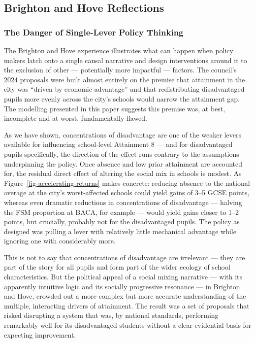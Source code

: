 \documentclass[
  11pt,
]{article}
\begin{document}
\subsection{Brighton and Hove
Reflections}\label{brighton-and-hove-reflections}

\subsubsection{The Danger of Single-Lever Policy
Thinking}\label{the-danger-of-single-lever-policy-thinking}

The Brighton and Hove experience illustrates what can happen when policy
makers latch onto a single causal narrative and design interventions
around it to the exclusion of other --- potentially more impactful ---
factors. The council's 2024 proposals were built almost entirely on the
premise that attainment in the city was ``driven by economic advantage''
and that redistributing disadvantaged pupils more evenly across the
city's schools would narrow the attainment gap. The modelling presented
in this paper suggests this premise was, at best, incomplete and at
worst, fundamentally flawed.

As we have shown, concentrations of disadvantage are one of the weaker
levers available for influencing school-level Attainment 8 --- and for
disadvantaged pupils specifically, the direction of the effect runs
contrary to the assumptions underpinning the policy. Once absence and
low prior attainment are accounted for, the residual direct effect of
altering the social mix in schools is modest. As
Figure~\ref{fig-accelerating-returns} makes concrete: reducing absence
to the national average at the city's worst-affected schools could yield
gains of 3--5 GCSE points, whereas even dramatic reductions in
concentrations of disadvantage --- halving the FSM proportion at BACA,
for example --- would yield gains closer to 1--2 points, but crucially,
probably not for the disadvantaged pupils. The policy as designed was
pulling a lever with relatively little mechanical advantage while
ignoring one with considerably more.

This is not to say that concentrations of disadvantage are irrelevant
--- they are part of the story for all pupils and form part of the wider
ecology of school characteristics. But the political appeal of a social
mixing narrative --- with its apparently intuitive logic and its
socially progressive resonance --- in Brighton and Hove, crowded out a
more complex but more accurate understanding of the multiple,
interacting drivers of attainment. The result was a set of proposals
that risked disrupting a system that was, by national standards,
performing remarkably well for its disadvantaged students without a
clear evidential basis for expecting improvement.
\end{document}
